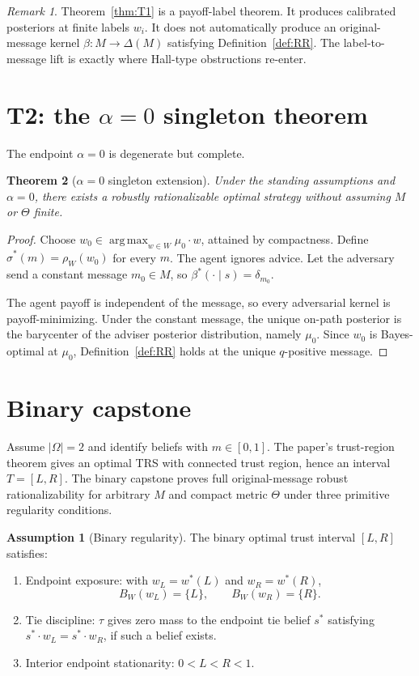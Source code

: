 \documentclass[11pt]{article}
\newtheorem{theorem}{Theorem}
\theoremstyle{definition}
\newtheorem{assumption}{Assumption}
\theoremstyle{remark}
\newtheorem{remark}[theorem]{Remark}
\newcommand{\Om}{\Omega}
\newcommand{\argmax}{\operatorname*{arg\,max}}
\begin{document}
\begin{remark}
Theorem~\ref{thm:T1} is a payoff-label theorem. It produces calibrated posteriors at finite labels $w_i$. It does not automatically produce an original-message kernel $\beta:M\to\Delta(M)$ satisfying Definition~\ref{def:RR}. The label-to-message lift is exactly where Hall-type obstructions re-enter.
\end{remark}

\section{T2: the $\alpha=0$ singleton theorem}\label{sec:t2}

The endpoint $\alpha=0$ is degenerate but complete.

\begin{theorem}[$\alpha=0$ singleton extension]\label{thm:T2}
Under the standing assumptions and $\alpha=0$, there exists a robustly rationalizable optimal strategy without assuming $M$ or $\Theta$ finite.
\end{theorem}

\begin{proof}
Choose $w_0\in\argmax_{w\in W}\mu_0\cdot w$, attained by compactness. Define $\hat\sigma^*(m)=\rho_W(w_0)$ for every $m$. The agent ignores advice. Let the adversary send a constant message $m_0\in M$, so $\beta^*(\cdot\mid s)=\delta_{m_0}$.

The agent payoff is independent of the message, so every adversarial kernel is payoff-minimizing. Under the constant message, the unique on-path posterior is the barycenter of the adviser posterior distribution, namely $\mu_0$. Since $w_0$ is Bayes-optimal at $\mu_0$, Definition~\ref{def:RR} holds at the unique $q$-positive message.
\end{proof}

\section{Binary capstone}\label{sec:binary}

Assume $|\Om|=2$ and identify beliefs with $m\in[0,1]$. The paper's trust-region theorem gives an optimal TRS with connected trust region, hence an interval $T=[L,R]$. The binary capstone proves full original-message robust rationalizability for arbitrary $M$ and compact metric $\Theta$ under three primitive regularity conditions.

\begin{assumption}[Binary regularity]\label{ass:binaryreg}
The binary optimal trust interval $[L,R]$ satisfies:
\begin{enumerate}[label=(R-\arabic*)]
  \item Endpoint exposure: with $w_L=w^*(L)$ and $w_R=w^*(R)$,
  \[
    B_W(w_L)=\{L\},\qquad B_W(w_R)=\{R\}.
  \]
  \item Tie discipline: $\tau$ gives zero mass to the endpoint tie belief $s^*$ satisfying $s^*\cdot w_L=s^*\cdot w_R$, if such a belief exists.
  \item Interior endpoint stationarity: $0<L<R<1$.
\end{enumerate}
\end{assumption}
\end{document}
